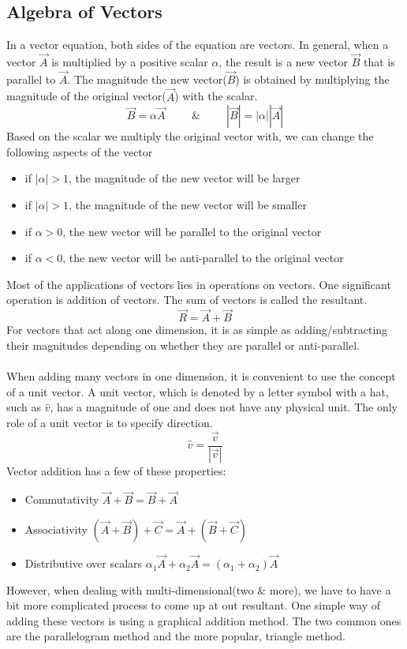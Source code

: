 \documentclass[12pt,addpoints]{exam}
\begin{document}
    \subsection*{Algebra of Vectors}
    In a vector equation, both sides of the equation are vectors. In general, when a vector $\vec{A}$ is multiplied by a positive scalar $\alpha$, the result is a new vector $\vec{B}$
    that is parallel to $\vec{A}$. The magnitude the new vector($\vec{B}$) is obtained by multiplying the magnitude of the original vector($\vec{A}$) with the scalar.
    $$\vec{B} = \alpha \vec{A}\hspace{1cm}\text{\&}\hspace{1cm}|\vec{B}|= |\alpha| |\vec{A}|$$
    Based on the scalar we multiply the original vector with, we can change the following aspects of the vector
    \begin{itemize}
    	\item if $|\alpha|>1$, the magnitude of the new vector will be larger 
    	\item if $|\alpha|>1$, the magnitude of the new vector will be smaller
    	\item if $\alpha>0$, the new vector will be parallel to the original vector
    	\item if $\alpha<0$, the new vector will be anti-parallel to the original vector
    \end{itemize}
	Most of the applications of vectors lies in operations on vectors. One significant operation is addition of vectors. The sum of vectors is called the resultant. 
	$$\vec{R}=\vec{A}+\vec{B}$$
	For vectors that act along one dimension, it is as simple as adding/subtracting their magnitudes depending on whether they are parallel or anti-parallel. 
	\\ \\
	When adding many vectors in one dimension, it is convenient to use the concept of a unit vector. A unit vector, which is denoted by a letter symbol with a hat, such as  $\hat{v}$, has a magnitude of one and does not have any physical unit. The only role of a unit vector is to specify direction.
	$$\hat{v}=\dfrac{\vec{v}}{|\vec{v}|}$$
	Vector addition has a few of these properties:
	\begin{itemize}
		\item Commutativity $\vec{A} + \vec{B} = \vec{B} + \vec{A}$
		\item Associativity $(\vec{A} + \vec{B}) + \vec{C} = \vec{A} + (\vec{B} + \vec{C})$
		\item Distributive over scalars $\alpha_{1} \vec{A} + \alpha_{2} \vec{A} = (\alpha_{1} + \alpha_{2}) \vec{A}$
	\end{itemize}
	However, when dealing with multi-dimensional(two \& more), we have to have a bit more complicated process to come up at out resultant. One simple way of adding these vectors is using a graphical addition method. The two common ones are the parallelogram method and the more popular, triangle method.
\end{document}
